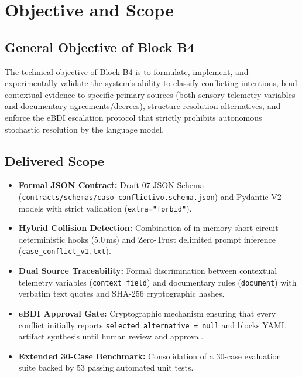 \documentclass[11pt,a4paper]{article}
\begin{document}
\section{Objective and Scope}

\subsection{General Objective of Block B4}
The technical objective of Block B4 is to formulate, implement, and experimentally validate the system's ability to classify conflicting intentions, bind contextual evidence to specific primary sources (both sensory telemetry variables and documentary agreements/decrees), structure resolution alternatives, and enforce the eBDI escalation protocol that strictly prohibits autonomous stochastic resolution by the language model.

\subsection{Delivered Scope}
\begin{itemize}[leftmargin=*]
    \item \textbf{Formal JSON Contract:} Draft-07 JSON Schema (\texttt{contracts/schemas/caso-conflictivo.schema.json}) and Pydantic V2 models with strict validation (\texttt{extra="forbid"}).
    \item \textbf{Hybrid Collision Detection:} Combination of in-memory short-circuit deterministic hooks (5.0\,ms) and Zero-Trust delimited prompt inference (\texttt{case\_conflict\_v1.txt}).
    \item \textbf{Dual Source Traceability:} Formal discrimination between contextual telemetry variables (\texttt{context\_field}) and documentary rules (\texttt{document}) with verbatim text quotes and SHA-256 cryptographic hashes.
    \item \textbf{eBDI Approval Gate:} Cryptographic mechanism ensuring that every conflict initially reports \texttt{selected\_alternative = null} and blocks YAML artifact synthesis until human review and approval.
    \item \textbf{Extended 30-Case Benchmark:} Consolidation of a 30-case evaluation suite backed by 53 passing automated unit tests.
\end{itemize}
\end{document}
